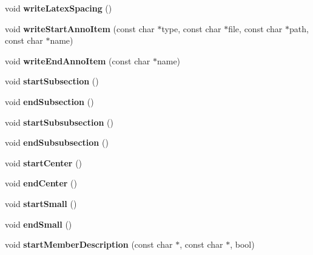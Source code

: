 \begin{DoxyCompactItemize}
void {\bfseries write\+Latex\+Spacing} ()
\item 
\mbox{\label{class_latex_generator_a21b7b03364f200aa447b2a403aaa8fd8}} 
void {\bfseries write\+Start\+Anno\+Item} (const char $\ast$type, const char $\ast$file, const char $\ast$path, const char $\ast$name)
\item 
\mbox{\label{class_latex_generator_a693962a41191433fd5ded47259149358}} 
void {\bfseries write\+End\+Anno\+Item} (const char $\ast$name)
\item 
\mbox{\label{class_latex_generator_a39d4b6c5ce49e1a2cef9d6046e78ef92}} 
void {\bfseries start\+Subsection} ()
\item 
\mbox{\label{class_latex_generator_a076423c36308d68eaa4ae934909960ea}} 
void {\bfseries end\+Subsection} ()
\item 
\mbox{\label{class_latex_generator_a845056c8248cf0662d95aa4b584fe561}} 
void {\bfseries start\+Subsubsection} ()
\item 
\mbox{\label{class_latex_generator_a4eb7f9f80bf4407d5b23c1b13d0a560b}} 
void {\bfseries end\+Subsubsection} ()
\item 
\mbox{\label{class_latex_generator_a9ee4283738dc975f9b31b554a0de945e}} 
void {\bfseries start\+Center} ()
\item 
\mbox{\label{class_latex_generator_a8c5c4da427d30d6ef2756c036e0e88d1}} 
void {\bfseries end\+Center} ()
\item 
\mbox{\label{class_latex_generator_a1b522f2da59b6ee8f3ac0d10478ea9bd}} 
void {\bfseries start\+Small} ()
\item 
\mbox{\label{class_latex_generator_aa0f89ab599109d222204ed70531feb84}} 
void {\bfseries end\+Small} ()
\item 
\mbox{\label{class_latex_generator_a187b9f90343166cc821c1cdcec4fee6a}} 
void {\bfseries start\+Member\+Description} (const char $\ast$, const char $\ast$, bool)

\end{DoxyCompactItemize}
